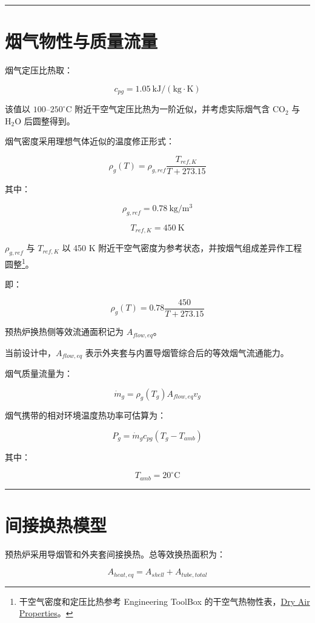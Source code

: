 \documentclass[UTF8,openany,zihao=-4,oneside]{ctexbook}
\newcommand{\manualdivider}{\par\vspace{0.6em}\noindent\textcolor{FGLine}{\rule{\linewidth}{0.7pt}}\vspace{0.6em}\par}
\begin{document}
\manualdivider

\section{烟气物性与质量流量}\label{ux70dfux6c14ux7269ux6027ux4e0eux8d28ux91cfux6d41ux91cf}

烟气定压比热取：

\[
c_{pg}=1.05\ \mathrm{kJ/(kg\cdot K)}
\]

该值以 \(100\text{--}250^\circ\mathrm{C}\) 附近干空气定压比热为一阶近似，并考虑实际烟气含 \(\mathrm{CO_2}\) 与 \(\mathrm{H_2O}\) 后圆整得到。

烟气密度采用理想气体近似的温度修正形式：

\[
\rho_g(T)=\rho_{g,ref}\frac{T_{ref,K}}{T+273.15}
\]

其中：

\[
\rho_{g,ref}=0.78\ \mathrm{kg/m^3}
\]

\[
T_{ref,K}=450\ \mathrm{K}
\]

\(\rho_{g,ref}\) 与 \(T_{ref,K}\) 以 450 K 附近干空气密度为参考状态，并按烟气组成差异作工程圆整\footnote{干空气密度和定压比热参考 Engineering ToolBox 的干空气热物性表，\href{https://www.engineeringtoolbox.com/dry-air-properties-d_973.html}{Dry Air Properties}。}。

即：

\[
\rho_g(T)=0.78\frac{450}{T+273.15}
\]

预热炉换热侧等效流通面积记为 \(A_{flow,eq}\)。

当前设计中，\(A_{flow,eq}\) 表示外夹套与内置导烟管综合后的等效烟气流通能力。

烟气质量流量为：

\[
\dot m_g=\rho_g(T_g)A_{flow,eq}v_g
\]

烟气携带的相对环境温度热功率可估算为：

\[
P_g=\dot m_gc_{pg}(T_g-T_{amb})
\]

其中：

\[
T_{amb}=20^\circ\mathrm{C}
\]

\manualdivider

\section{间接换热模型}\label{ux95f4ux63a5ux6362ux70edux6a21ux578b}

预热炉采用导烟管和外夹套间接换热。总等效换热面积为：

\[
A_{heat,eq}=A_{shell}+A_{tube,total}
\]
\end{document}
